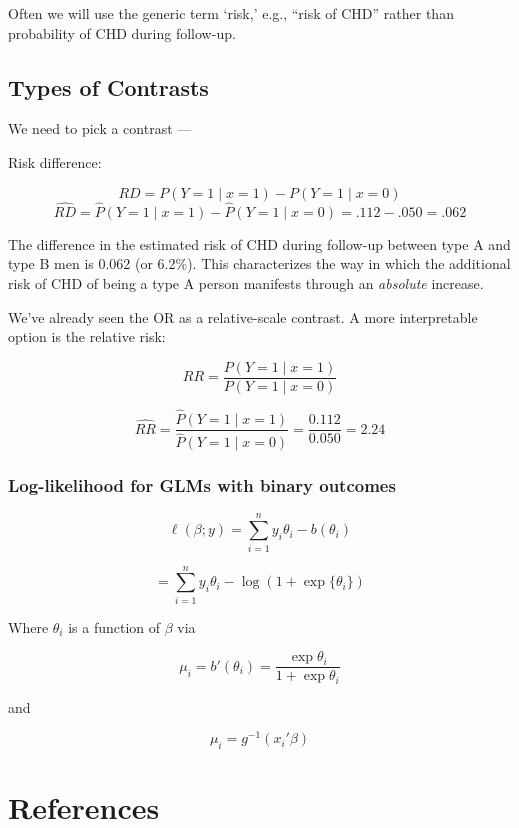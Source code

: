 \documentclass[
  letterpaper,
  DIV=11,
  numbers=noendperiod]{scrreport}
\begin{document}
Often we will use the generic term `risk,' e.g., ``risk of CHD'' rather
than probability of CHD during follow-up.

\hypertarget{types-of-contrasts}{%
\section{Types of Contrasts}\label{types-of-contrasts}}

We need to pick a contrast ---

Risk difference:

\[RD = P(Y = 1 \mid x = 1) - P(Y = 1 \mid x = 0)\]
\[\widehat{RD} = \hat P(Y = 1 \mid x = 1) - \hat P(Y=1 \mid x = 0) = .112 - .050 = .062\]

The difference in the estimated risk of CHD during follow-up between
type A and type B men is 0.062 (or 6.2\%). This characterizes the way in
which the additional risk of CHD of being a type A person manifests
through an \emph{absolute} increase.

We've already seen the OR as a relative-scale contrast. A more
interpretable option is the relative risk:

\[RR = \frac{P(Y = 1 \mid x = 1)}{P(Y = 1 \mid x = 0)}\]

\[\widehat{RR} = \frac{\hat P(Y = 1 \mid x = 1)}{\hat P(Y = 1 \mid x = 0)} = \frac{0.112}{0.050} = 2.24 \]

\hypertarget{log-likelihood-for-glms-with-binary-outcomes}{%
\subsection{Log-likelihood for GLMs with binary
outcomes}\label{log-likelihood-for-glms-with-binary-outcomes}}

\[\ell(\beta; y) = \sum_{i=1}^n y_i \theta_i - b(\theta_i)\]

\[ = \sum_{i=1}^n y_i \theta_i - \log(1 + \exp\{\theta_i\})\]

Where \(\theta_i\) is a function of \(\beta\) via

\[\mu_i = b'(\theta_i) = \frac{\exp \theta_i}{1 + \exp \theta_i}\]

and

\[\mu_i = g^{-1}(x_i'\beta)\]


\hypertarget{references}{%
\chapter*{References}\label{references}}
\end{document}
